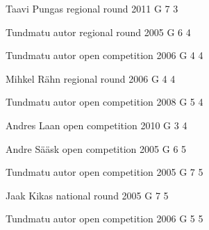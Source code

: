 \documentclass[11pt]{article}
\begin{document}
\ylDisplay{} %
{Taavi Pungas} %
{regional round} %
{2011} %
{G 7} %
{3} %
{

\ifEngStatement
\fi
}

\ylDisplay{} %
{Tundmatu autor} %
{regional round} %
{2005} %
{G 6} %
{4} %
{

\ifEngStatement
\fi
}

\ylDisplay{} %
{Tundmatu autor} %
{open competition} %
{2006} %
{G 4} %
{4} %
{

\ifEngStatement
\fi
}

\ylDisplay{} %
{Mihkel Rähn} %
{regional round} %
{2006} %
{G 4} %
{4} %
{

\ifEngStatement
\fi
}

\ylDisplay{} %
{Tundmatu autor} %
{open competition} %
{2008} %
{G 5} %
{4} %
{

\ifEngStatement
\fi
}

\ylDisplay{} %
{Andres Laan} %
{open competition} %
{2010} %
{G 3} %
{4} %
{

\ifEngStatement
\fi
}

\ylDisplay{} %
{Andre Sääsk} %
{open competition} %
{2005} %
{G 6} %
{5} %
{

\ifEngStatement
\fi
}

\ylDisplay{} %
{Tundmatu autor} %
{open competition} %
{2005} %
{G 7} %
{5} %
{

\ifEngStatement
\fi
}

\ylDisplay{} %
{Jaak Kikas} %
{national round} %
{2005} %
{G 7} %
{5} %
{

\ifEngStatement
\fi
}

\ylDisplay{} %
{Tundmatu autor} %
{open competition} %
{2006} %
{G 5} %
{5} %
{

\ifEngStatement
\fi
}
\end{document}
